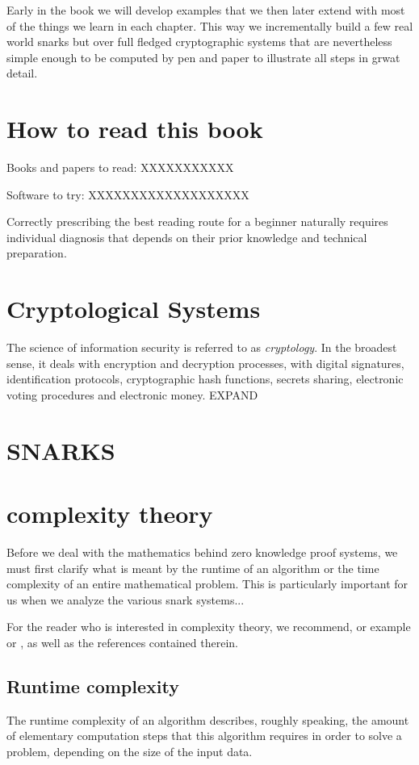 Early in the book we will develop examples that we then later extend with most of the things we learn in each chapter. This way we incrementally build a few real world snarks but over full fledged cryptographic systems that are nevertheless simple enough to be computed by pen and paper to illustrate all steps in grwat detail.


\section{How to read this book}

Books and papers to read: XXXXXXXXXXX

Software to try: XXXXXXXXXXXXXXXXXXX

Correctly prescribing the best reading route for a beginner naturally requires individual diagnosis that depends on their prior knowledge and technical preparation.

\section{Cryptological Systems}
The science of information security is referred to as \textit{cryptology}. In the broadest sense, it deals with encryption and decryption processes, with digital signatures, identification protocols, cryptographic hash functions, secrets sharing, electronic voting procedures and electronic money. EXPAND

\section{SNARKS}



\section{complexity theory}
Before we deal with the mathematics behind zero knowledge proof systems, we must first clarify what is meant by the runtime of an algorithm or the time complexity of an entire mathematical problem. This is particularly important for us when we analyze the various snark systems...

For the reader who is interested in complexity theory, we recommend, or example 
or 
, as well as the references contained therein.

\subsection{Runtime complexity}
The runtime complexity of an algorithm describes, roughly speaking, the amount of elementary computation steps that this algorithm requires in order to solve a problem, depending on the size of the input data.

